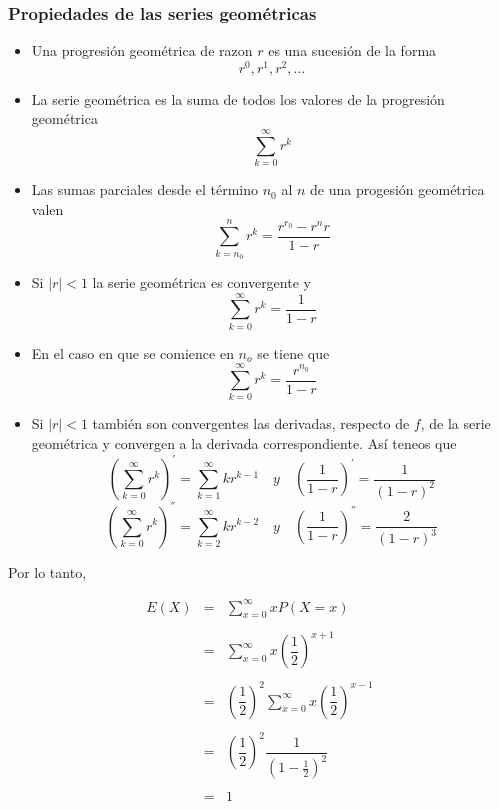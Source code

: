 \documentclass[
]{article}
\begin{document}
\hypertarget{propiedades-de-las-series-geomuxe9tricas}{%
\subsubsection{Propiedades de las series
geométricas}\label{propiedades-de-las-series-geomuxe9tricas}}

\begin{itemize}
\item Una progresión geométrica de razon $r$ es una sucesión de la forma 
$$r^0,r^1,r^2, \ldots$$

\item La serie geométrica es la suma de todos los valores de la progresión geométrica
$$\sum_{k=0}^\infty r^k$$
\item Las sumas parciales desde el término $n_0$ al $n$ de una progesión geométrica valen
$$\sum_{k=n_0}^n r^k = \dfrac{r^{r_0}-r^n r}{1-r}$$
\item Si $|r|<1$ la serie geométrica es convergente y 
$$\sum_{k=0}^\infty r^k = \dfrac{1}{1-r}$$
\item En el caso en que se comience en $n_o$ se tiene que
$$\sum_{k=0}^\infty r^k = \dfrac{r^{n_0}}{1-r}$$
\item Si $|r|<1$ también son convergentes las derivadas, respecto de $f$, de la serie geométrica y convergen a la derivada correspondiente. Así teneos que 
$$\left(\sum_{k=0}^\infty r^k\right)^{'} = \sum_{k=1}^\infty kr^{k-1} \quad y \quad \left(\dfrac{1}{1-r}\right)^{'} = \dfrac{1}{(1-r)^2}$$
$$\left(\sum_{k=0}^\infty r^k\right)^{''} = \sum_{k=2}^\infty kr^{k-2}\quad y \quad \left(\dfrac{1}{1-r}\right)^{''} = \dfrac{2}{(1-r)^3}$$
\end{itemize}

Por lo tanto,

\[\begin{array}{rcl}
  E(X)&=&\sum\limits_{x=0}^\infty xP(X=x)\\\\
  &=&\sum\limits_{x=0}^\infty x\left(\dfrac{1}{2}\right)^{x+1}\\\\
  &=&\left(\dfrac{1}{2}\right)^2 \sum\limits_{x=0}^\infty x\left(\dfrac{1}{2}\right)^{x-1}\\\\  
  &=&\left(\dfrac{1}{2}\right)^2 \dfrac{1}{(1-\frac{1}{2})^2}\\\\
  &=&1\\\\
\end{array}\]
\end{document}
